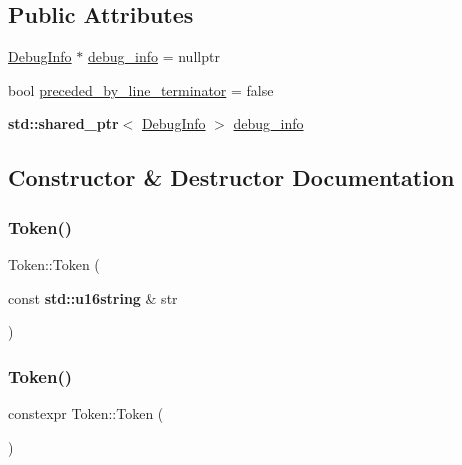 \subsection*{Public Attributes}
\begin{DoxyCompactItemize}
\item 
\hyperlink{struct_token_1_1_debug_info}{Debug\+Info} $\ast$ \hyperlink{class_token_addc71bf112cf6013bc9f9e05bcaa5b5e}{debug\+\_\+info} = nullptr
\item 
bool \hyperlink{class_token_afac81ad105ee2e0ce26fa5c9adcf8e57}{preceded\+\_\+by\+\_\+line\+\_\+terminator} = false
\item 
\textbf{ std\+::shared\+\_\+ptr}$<$ \hyperlink{struct_token_1_1_debug_info}{Debug\+Info} $>$ \hyperlink{class_token_ae1c97965fb8e3c18c0b4e38b6d826266}{debug\+\_\+info}
\end{DoxyCompactItemize}


\subsection{Constructor \& Destructor Documentation}
\mbox{\label{class_token_a5fcfb5de8c671eb8c4b5acaf13e3e67c}} 
\subsubsection{\texorpdfstring{Token()}{Token()}\hspace{0.1cm}{\footnotesize\ttfamily [1/16]}}
{\footnotesize\ttfamily Token\+::\+Token (\begin{DoxyParamCaption}\item[{const \textbf{ std\+::u16string} \&}]{str }\end{DoxyParamCaption})\hspace{0.3cm}{\ttfamily [inline]}}

\mbox{\label{class_token_aebaa2e391d98c62d1afbe02450e7f982}} 
\subsubsection{\texorpdfstring{Token()}{Token()}\hspace{0.1cm}{\footnotesize\ttfamily [2/16]}}
{\footnotesize\ttfamily constexpr Token\+::\+Token (\begin{DoxyParamCaption}{ }\end{DoxyParamCaption})\hspace{0.3cm}{\ttfamily [inline]}}

